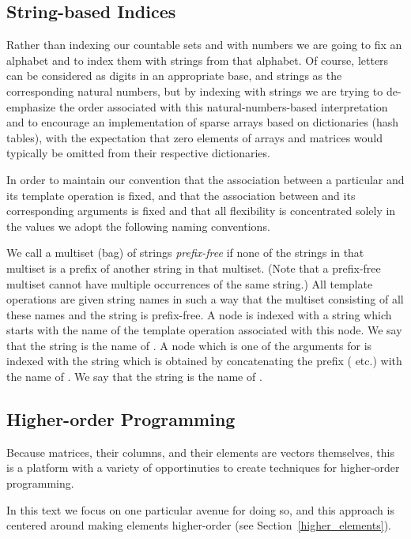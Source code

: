 \documentclass[withtimes]{easychair}
\begin{document}
\subsection{String-based Indices}\label{string_indices}

Rather than indexing our countable sets  and  with numbers we are going to fix an alphabet and to index them with
strings from that alphabet. Of course, letters can be considered as digits in an appropriate base, and strings as the corresponding natural
numbers, but by indexing with strings we are trying to de-emphasize the order associated with this natural-numbers-based
interpretation and to encourage an implementation of sparse arrays based on dictionaries (hash tables), with the expectation
that zero elements of arrays and matrices would typically be omitted from their respective dictionaries.

In order to maintain our convention that the association between a particular  and its template operation is fixed, and
that the association between  and its corresponding arguments  is fixed and
that all flexibility is concentrated solely in the values  we adopt the following naming conventions.

We call a multiset (bag) of strings {\em prefix-free} if none of the strings in that multiset is a prefix of another string in that multiset.
(Note that a prefix-free multiset cannot have multiple occurrences of the same string.)
All template operations are given string names in such a way that the multiset consisting of all these names and the string 
is prefix-free. A node  is indexed with a string  which starts with the name of the template operation associated with
this node. We say that the string  is the name of .
 A node  which is one of the arguments for  is indexed with the string  which is obtained by
concatenating the prefix  ( etc.) with the name of . We say that the string  is the name of .

\subsection{Higher-order Programming}

Because matrices, their columns, and their elements are vectors themselves, this is a platform with a variety of opportinuties
to create techniques for higher-order programming.

In this text we focus on one particular avenue for doing so, and this approach is centered around making
elements  higher-order (see Section~\ref{higher_elements}).
\end{document}
